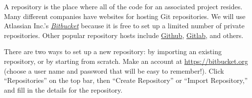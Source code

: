 A repository is the place where all of the code for an associated project resides.
Many different companies have websites for hosting Git repositories.
We will use Atlassian Inc.'s \href{https://bitbucket.org/}{\emph{Bitbucket}} because it is free to set up a limited number of private repositories.
Other popular repository hosts include \href{https://github.com/}{Github}, \href{https://gitlab.com/}{Gitlab}, and others.

There are two ways to set up a new repository: by importing an existing repository, or by starting from scratch.
Make an account at \url{https://bitbucket.org} (choose a user name and password that will be easy to remember!).
Click ``Repositories'' on the top bar, then ``Create Repository'' or ``Import Repository,'' and fill in the details for the repository.

\begin{comment} %
\begin{enumerate}
\item Make an account at \url{https://bitbucket.org}.
Choose a user name and password that will be easy to remember!
\item Click ``not now'' if it asks you to set up your first repository.
\item To import an existing repository:
\begin{enumerate}
    \item Click ``Repositories,'' then ``Import Repository.''
    \item Give it the URL for the existing repository.%
    \item Fill in the description for the repository.
    \item Name the repository. %
    Once your repository is created, renaming it may cause connectivity issues, so choose wisely!
    \item Press ``Import repository.''
\end{enumerate}
\item To create an empty repository from scratch:
\begin{enumerate}
    \item Click ``Repositories,'' then ``Create Repository.''
    \item Fill in the name of the repository

\end{enumerate}
\end{enumerate}
\end{comment}

